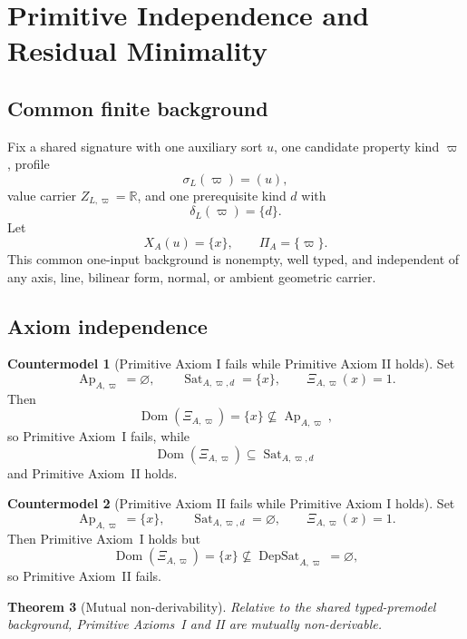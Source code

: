 \documentclass[11pt]{article}
\newcommand{\Ap}{\operatorname{Ap}}
\newcommand{\DepSat}{\operatorname{DepSat}}
\newcommand{\Sat}{\operatorname{Sat}}
\newcommand{\Dom}{\operatorname{Dom}}
\newtheorem{theorem}{Theorem}[section]
\theoremstyle{definition}
\newtheorem{countermodel}[theorem]{Countermodel}
\theoremstyle{remark}
\begin{document}
\section{Primitive Independence and Residual Minimality}
\label{sec:independence}

\subsection{Common finite background}

Fix a shared signature with one auxiliary sort \(u\), one candidate property kind \(\varpi\), profile
\[
\sigma_L(\varpi)=(u),
\]
value carrier \(Z_{L,\varpi}=\mathbb R\), and one prerequisite kind \(d\) with
\[
\delta_L(\varpi)=\{d\}.
\]
Let
\[
X_A(u)=\{x\},
\qquad
\Pi_A=\{\varpi\}.
\]
This common one-input background is nonempty, well typed, and independent of any axis, line, bilinear form, normal, or ambient geometric carrier.

\subsection{Axiom independence}

\begin{countermodel}[Primitive Axiom I fails while Primitive Axiom II holds]
\label{cm:pi}
Set
\[
\Ap_{A,\varpi}=\varnothing,
\qquad
\Sat_{A,\varpi,d}=\{x\},
\qquad
\Xi_{A,\varpi}(x)=1.
\]
Then
\[
\Dom(\Xi_{A,\varpi})=\{x\}\not\subseteq\Ap_{A,\varpi},
\]
so Primitive Axiom~I fails, while
\[
\Dom(\Xi_{A,\varpi})\subseteq\Sat_{A,\varpi,d}
\]
and Primitive Axiom~II holds.
\end{countermodel}

\begin{countermodel}[Primitive Axiom II fails while Primitive Axiom I holds]
\label{cm:pii}
Set
\[
\Ap_{A,\varpi}=\{x\},
\qquad
\Sat_{A,\varpi,d}=\varnothing,
\qquad
\Xi_{A,\varpi}(x)=1.
\]
Then Primitive Axiom~I holds but
\[
\Dom(\Xi_{A,\varpi})=\{x\}\not\subseteq\DepSat_{A,\varpi}=\varnothing,
\]
so Primitive Axiom~II fails.
\end{countermodel}

\begin{theorem}[Mutual non-derivability]
\label{thm:independence}
Relative to the shared typed-premodel background, Primitive Axioms~I and II are mutually non-derivable.
\end{theorem}
\end{document}
